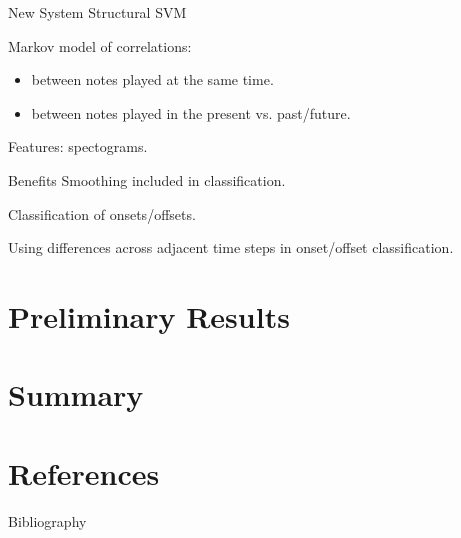\documentclass{beamer}
\begin{document}
\begin{frame}{New System}
Structural SVM

\vspace{1em}
Markov model of correlations:
\begin{itemize}
\item between notes played at the same time.
\item between notes played in the present vs. past/future.
\end{itemize}

\vspace{1em}
Features: spectograms.
\end{frame}

\begin{frame}{Benefits}
Smoothing included in classification.

\vspace{1em}
Classification of onsets/offsets.

\vspace{1em}
Using differences across adjacent time steps in onset/offset classification.
\end{frame}

\section{Preliminary Results}
\begin{frame}
\end{frame}

\section{Summary}
\begin{frame}
\end{frame}

\section{References}
\begin{frame}{Bibliography}

\nocite{*}

\end{frame}
\end{document}
